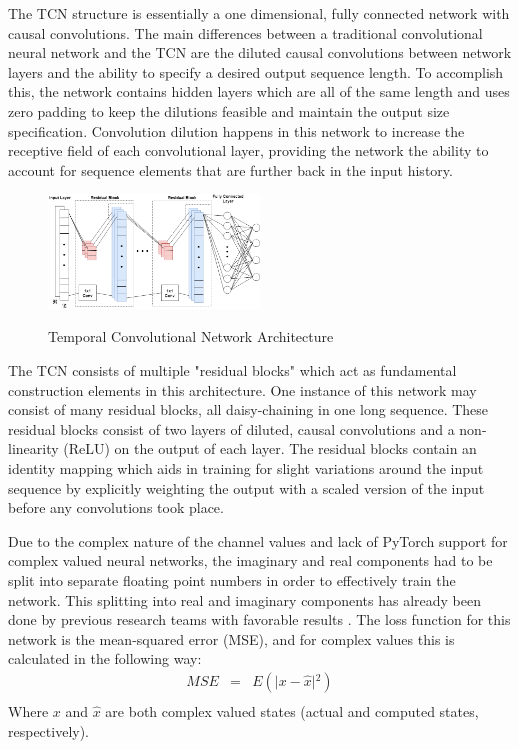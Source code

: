 \documentclass[twocolumn,letterpaper]{IEEEAerospaceCLS}  %
\begin{document}
The TCN structure is essentially a one dimensional, fully connected network with causal convolutions. The main differences between a traditional convolutional neural network and the TCN are the diluted causal convolutions between network layers and the ability to specify a desired output sequence length. To accomplish this, the network contains hidden layers which are all of the same length and uses zero padding to keep the dilutions feasible and maintain the output size specification. Convolution dilution happens in this network to increase the receptive field of each convolutional layer, providing the network the ability to account for sequence elements that are further back in the input history. 

\begin{figure}[!h]
\centering\includegraphics[width=0.5\textwidth]{figs/TCN.png}\\
\caption{Temporal Convolutional Network Architecture}
\label{stabf1f2}
\end{figure}

The TCN consists of multiple "residual blocks" which act as fundamental construction elements in this architecture. One instance of this network may consist of many residual blocks, all daisy-chaining in one long sequence. These residual blocks consist of two layers of diluted, causal convolutions and a non-linearity (ReLU) on the output of each layer. The residual blocks contain an identity mapping which aids in training for slight variations around the input sequence by explicitly weighting the output with a scaled version of the input before any convolutions took place. 

Due to the complex nature of the channel values and lack of PyTorch support for complex valued neural networks, the imaginary and real components had to be split into separate floating point numbers in order to effectively train the network. This splitting into real and imaginary components has already been done by previous research teams with favorable results \cite{tacspinar2010back}.  The loss function for this network is the mean-squared error (MSE), and for complex values this is calculated in the following way:
\begin{eqnarray*}
MSE&=&E(\lvert {x-\hat{x}}\rvert{^2}) \\
\end{eqnarray*}
Where $x$ and $\hat{x}$ are both complex valued states (actual and computed states, respectively). 
\end{document}
